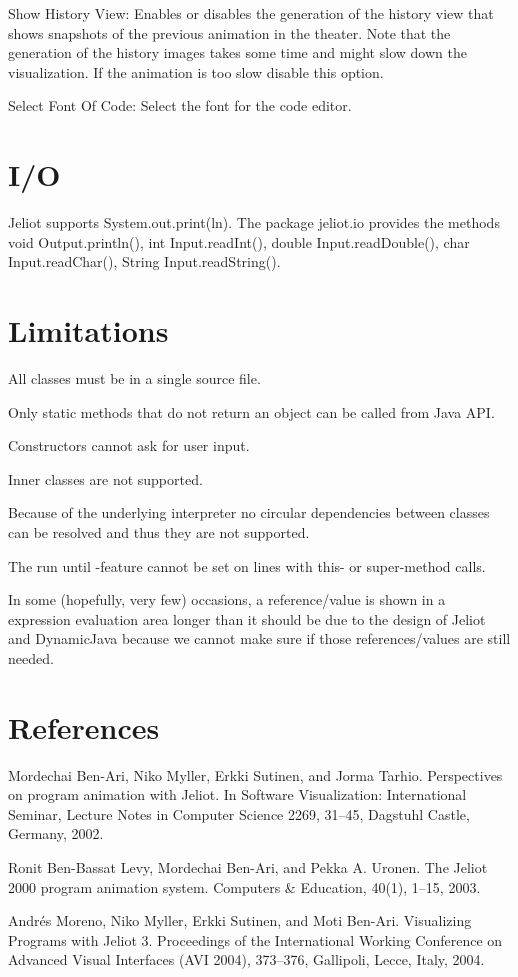 \documentclass{article}
\begin{document}
Show History View: Enables or disables the generation of the history view that
shows snapshots of the previous animation in the theater. Note that the generation of
the history images takes some time and might slow down the visualization. If the animation
is too slow disable this option.

Select Font Of Code: Select the font for the code editor.

\section{I/O}

Jeliot supports System.out.print(ln). The package jeliot.io provides the 
methods void Output.println(), int Input.readInt(), double Input.readDouble(), 
char Input.readChar(), String Input.readString().

\section{Limitations}

All classes must be in a single source file. 

Only static methods that do not return an object can be called from Java API.

Constructors cannot ask for user input.

Inner classes are not supported.

Because of the underlying interpreter no circular dependencies between classes can be resolved and thus they are not supported.

The run until -feature cannot be set on lines with this- or super-method calls.

In some (hopefully, very few) occasions, a reference/value is shown in a expression evaluation area longer than it should be due to the design of Jeliot and DynamicJava because we cannot make sure if those references/values are still needed.

\section{References}

Mordechai Ben-Ari, Niko Myller, Erkki Sutinen, and Jorma Tarhio. Perspectives 
on program animation with Jeliot. In Software Visualization: International 
Seminar, Lecture Notes in Computer Science 2269, 31--45, Dagstuhl Castle, 
Germany, 2002.

Ronit Ben-Bassat Levy, Mordechai Ben-Ari, and Pekka A. Uronen. The Jeliot 2000 
program animation system. Computers \& Education, 40(1), 1--15, 2003.

Andr\'{e}s Moreno, Niko Myller, Erkki Sutinen, and Moti Ben-Ari. Visualizing Programs with Jeliot 3. Proceedings of the International Working Conference on Advanced Visual Interfaces (AVI 2004), 373--376, Gallipoli, Lecce, Italy, 2004.
\end{document}
